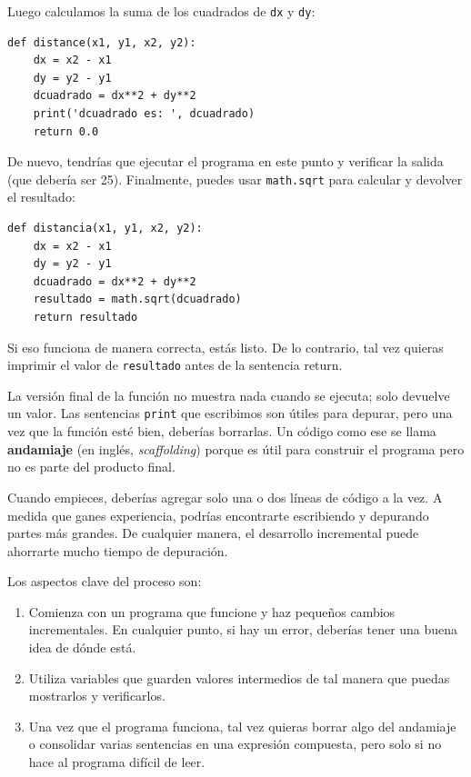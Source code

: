 \documentclass[10pt]{book}
\begin{document}
Luego calculamos la suma de los cuadrados de {\tt dx} y {\tt dy}:

\begin{verbatim}
def distance(x1, y1, x2, y2):
    dx = x2 - x1
    dy = y2 - y1
    dcuadrado = dx**2 + dy**2
    print('dcuadrado es: ', dcuadrado)
    return 0.0
\end{verbatim}
%
De nuevo, tendrías que ejecutar el programa en este punto y verificar la salida
(que debería ser 25).
Finalmente, puedes usar {\tt math.sqrt} para calcular y devolver el resultado:

\begin{verbatim}
def distancia(x1, y1, x2, y2):
    dx = x2 - x1
    dy = y2 - y1
    dcuadrado = dx**2 + dy**2
    resultado = math.sqrt(dcuadrado)
    return resultado
\end{verbatim}
%
Si eso funciona de manera correcta, estás listo.  De lo contrario, tal vez
quieras imprimir el valor de {\tt resultado} antes de la sentencia
return.

La versión final de la función no muestra nada cuando se
ejecuta; solo devuelve un valor.  Las sentencias {\tt print} que escribimos
son útiles para depurar, pero una vez que la función esté bien, deberías
borrarlas.  Un código como ese se llama {\bf andamiaje} (en inglés, {\em scaffolding})
porque es útil para construir el programa pero no es parte del
producto final.

Cuando empieces, deberías agregar solo una o dos líneas de código a la
vez.  A medida que ganes experiencia, podrías encontrarte escribiendo
y depurando partes más grandes.  De cualquier manera, el desarrollo incremental
puede ahorrarte mucho tiempo de depuración.

Los aspectos clave del proceso son:

\begin{enumerate}

\item Comienza con un programa que funcione y haz pequeños cambios incrementales.
En cualquier punto, si hay un error, deberías tener una buena idea de
dónde está.

\item Utiliza variables que guarden valores intermedios de tal manera que puedas
mostrarlos y verificarlos.

\item Una vez que el programa funciona, tal vez quieras borrar algo del
andamiaje o consolidar varias sentencias en una expresión
compuesta, pero solo si no hace al programa difícil de
leer.

\end{enumerate}
\end{document}
